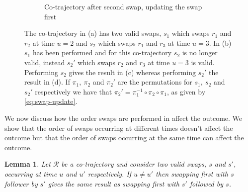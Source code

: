 \documentclass[12pt]{article}
\newcommand{\traj}{r}
\newcommand{\cotraj}{\mathcal{R}}
\newcommand{\swap}{s}
\newcommand{\swaptime}{u}
\newtheorem{lemma}{Lemma}
\theoremstyle{definition}
\begin{document}
\begin{figure}
\begin{subfigure}[t]{0.45\textwidth}
      \caption{Co-trajectory after second swap, updating the swap
        first}
      \label{fig:swap-order-d}
    \end{subfigure}
    \caption{The co-trajectory in (a) has two valid swaps,
      \(\swap_{1}\) which swaps \(\traj_{1}\) and \(\traj_{2}\) at
      time \(\swaptime = 2\) and \(\swap_{2}\) which swaps
      \(\traj_{1}\) and \(\traj_{3}\) at time \(\swaptime = 3\). In
      (b) \(\swap_{1}\) has been performed and for this co-trajectory
      \(\swap_{2}\) is no longer valid, instead \(\swap_{2}'\) which
      swaps \(\traj_{2}\) and \(\traj_{3}\) at time \(\swaptime = 3\)
      is valid. Performing \(\swap_{2}\) gives the result in (c)
      whereas performing \(\swap_{2}'\) the result in (d). If
      \(\pi_{1},\ \pi_{2}\) and \(\pi_{2}'\) are the permutations for
      \(\swap_{1},\ \swap_{2}\) and \(\swap_{2}'\) respectively we
      have that
      \(\pi_{2}' = \pi_{1}^{-1} \circ \pi_{2} \circ \pi_{1}\), as
      given by \ref{eq:swap-update}.}
    \label{fig:swap-order}
\end{figure}

We now discuss how the order swaps are performed in affect the
outcome. We show that the order of swaps occurring at different times
doesn't affect the outcome but that the order of swaps occurring at
the same time can affect the outcome.

\begin{lemma}
  \label{lemma:swap-order}
  Let \(\cotraj\) be a co-trajectory and consider two valid swaps,
  \(\swap\) and \(\swap'\), occurring at time \(\swaptime\) and
  \(\swaptime'\) respectively. If \(\swaptime \not= \swaptime'\) then
  swapping first with \(\swap\) follower by \(\swap'\) gives the same
  result as swapping first with \(\swap'\) followed by \(\swap\).
\end{lemma}
\end{document}

